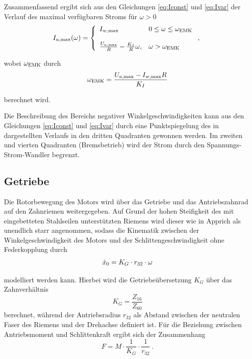 Zusammenfassend ergibt sich aus den Gleichungen \eqref{eq:Iconst} und \eqref{eq:Ivar} der Verlauf des maximal verfügbaren Stroms für $\omega > 0$
\[
I_{a \mathrm{, max}}(\omega) = \left\{\begin{array}{ll}
														I_{w\mathrm{, max}} 	& 0 \leq \omega \leq \omega_{\mathrm{EMK}} \\ \\				
														\frac{U_{a \mathrm{, max}}}{R} - \frac{K_I}{R} \omega, & \omega > \omega_{\mathrm{EMK}} \end{array}\right. ,\
\] 

wobei $\omega_{\mathrm{EMK}}$ durch
\begin{equation}\label{eq:wemk}
	\omega_{\mathrm{EMK}} = \frac{U_{a \mathrm{, max}} - I_{w\mathrm{, max}} R }{K_I}
\end{equation}

berechnet wird.

Die Beschreibung des Bereichs negativer Winkelgeschwindigkeiten kann aus den Gleichungen \eqref{eq:Iconst} und \eqref{eq:Ivar} durch eine Punktspiegelung des in  dargestellten Verlaufs in den dritten Quadranten gewonnen werden. Im zweiten und vierten Quadranten (Bremsbetrieb) wird der Strom durch den Spannungs-Strom-Wandler begrenzt.





\subsection{Getriebe}


Die Rotorbewegung des Motors wird über das Getriebe und das Antriebszahnrad auf den Zahnriemen weitergegeben. Auf Grund der hohen Steifigkeit des mit eingebetteten Stahlseilen unterstützten Riemens wird dieser wie in Apprich \cite{apprich} als unendlich starr angenommen, sodass die Kinematik zwischen der Winkelgeschwindigkeit des Motors und der Schlittengeschwindigkeit ohne Federkopplung durch
\begin{align}\label{eq:kinematik}
	\dot{x}_0 = K_G \cdot r_{32} \cdot \omega
\end{align}

modelliert werden kann.
 Hierbei wird die Getriebeübersetzung $K_G$ über das Zahnverhältnis 
\[
	K_G =  \frac{Z_{16}}{Z_{60}}
\]
berechnet, während der Antriebsradius $r_{32}$ als Abstand zwischen der neutralen Faser des Riemens und der Drehachse definiert ist. Für die Beziehung zwischen Antriebsmoment und Schlittenkraft ergibt sich der Zusammenhang
\[
	F = M \cdot \frac{1}{K_G} \cdot \frac{1}{r_{32}} \ .
\]

